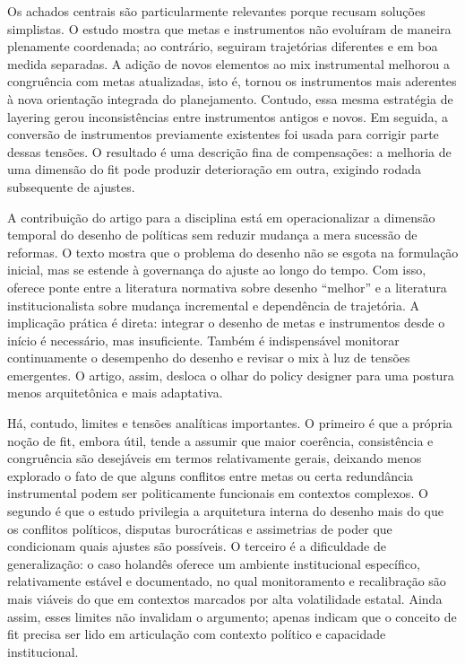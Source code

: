 \documentclass[12pt,a4paper]{article}
\begin{document}
Os achados centrais são particularmente relevantes porque recusam soluções simplistas. O estudo mostra que metas e instrumentos não evoluíram de maneira plenamente coordenada; ao contrário, seguiram trajetórias diferentes e em boa medida separadas. A adição de novos elementos ao mix instrumental melhorou a congruência com metas atualizadas, isto é, tornou os instrumentos mais aderentes à nova orientação integrada do planejamento. Contudo, essa mesma estratégia de layering gerou inconsistências entre instrumentos antigos e novos. Em seguida, a conversão de instrumentos previamente existentes foi usada para corrigir parte dessas tensões. O resultado é uma descrição fina de compensações: a melhoria de uma dimensão do fit pode produzir deterioração em outra, exigindo rodada subsequente de ajustes. \parencite{geet2019_policy_design}

A contribuição do artigo para a disciplina está em operacionalizar a dimensão temporal do desenho de políticas sem reduzir mudança a mera sucessão de reformas. O texto mostra que o problema do desenho não se esgota na formulação inicial, mas se estende à governança do ajuste ao longo do tempo. Com isso, oferece ponte entre a literatura normativa sobre desenho “melhor” e a literatura institucionalista sobre mudança incremental e dependência de trajetória. A implicação prática é direta: integrar o desenho de metas e instrumentos desde o início é necessário, mas insuficiente. Também é indispensável monitorar continuamente o desempenho do desenho e revisar o mix à luz de tensões emergentes. O artigo, assim, desloca o olhar do policy designer para uma postura menos arquitetônica e mais adaptativa. \parencite{geet2019_policy_design,lima2021_conectando_problemas}

Há, contudo, limites e tensões analíticas importantes. O primeiro é que a própria noção de fit, embora útil, tende a assumir que maior coerência, consistência e congruência são desejáveis em termos relativamente gerais, deixando menos explorado o fato de que alguns conflitos entre metas ou certa redundância instrumental podem ser politicamente funcionais em contextos complexos. O segundo é que o estudo privilegia a arquitetura interna do desenho mais do que os conflitos políticos, disputas burocráticas e assimetrias de poder que condicionam quais ajustes são possíveis. O terceiro é a dificuldade de generalização: o caso holandês oferece um ambiente institucional específico, relativamente estável e documentado, no qual monitoramento e recalibração são mais viáveis do que em contextos marcados por alta volatilidade estatal. Ainda assim, esses limites não invalidam o argumento; apenas indicam que o conceito de fit precisa ser lido em articulação com contexto político e capacidade institucional. \parencite{geet2019_policy_design,newman2020_policy_design}
\end{document}
